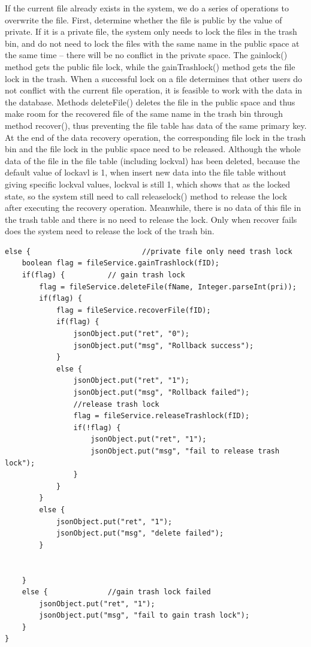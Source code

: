 \documentclass[a4paper,11pt]{article}
\begin{document}
\par If the current file already exists in the system, we do a series of operations to overwrite the file. First, determine whether the file is public by the value of private. If it is a private file, the system only needs to lock the files in the trash bin, and do not need to lock the files with the same name in the public space at the same time -- there will be no conflict in the private space. The gainlock() method gets the public file lock, while the gainTrashlock() method gets the file lock in the trash. When a successful lock on a file determines that other users do not conflict with the current file operation, it is feasible to work with the data in the database.
Methods deleteFile() deletes the file in the public space and thus make room for the recovered file of the same name in the trash bin through method recover(), thus preventing the file table has data of the same primary key. At the end of the data recovery operation, the corresponding file lock in the trash bin and the file lock in the public space need to be released. Although the whole data of the file in the file table (including lockval) has been deleted, because the default value of lockavl is 1, when insert new data into the file table without giving specific lockval values, lockval is still 1, which shows that as the locked state, so the system still need to call releaselock() method to release the lock after executing the recovery operation. Meanwhile, there is no data of this file in the trash table and there is no need to release the lock. Only when recover fails does the system need to release the lock of the trash bin.
\begin{lstlisting}
else {							//private file only need trash lock
	boolean flag = fileService.gainTrashlock(fID);
	if(flag) {			// gain trash lock
		flag = fileService.deleteFile(fName, Integer.parseInt(pri));
		if(flag) {
			flag = fileService.recoverFile(fID);
			if(flag) {
				jsonObject.put("ret", "0");
				jsonObject.put("msg", "Rollback success");
			}
			else {
				jsonObject.put("ret", "1");
				jsonObject.put("msg", "Rollback failed");
				//release trash lock 
				flag = fileService.releaseTrashlock(fID);
				if(!flag) {
					jsonObject.put("ret", "1");
					jsonObject.put("msg", "fail to release trash lock");
				}
			}
		}
		else {
			jsonObject.put("ret", "1");
			jsonObject.put("msg", "delete failed");
		}
		
		
	}
	else {				//gain trash lock failed
		jsonObject.put("ret", "1");
		jsonObject.put("msg", "fail to gain trash lock");
	}
}
\end{lstlisting}
\end{document}
